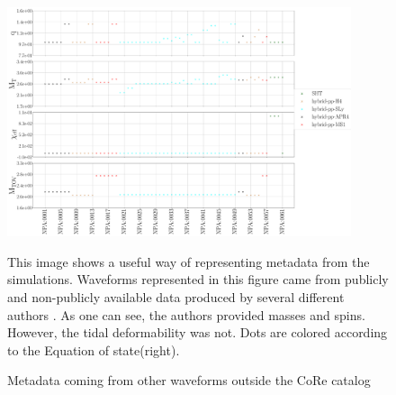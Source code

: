 \begin{figure}[hbt!]
\begin{center}
\includegraphics[width=0.9\textwidth, angle=0]{images/Data_analysis/results/LAL_cat.pdf} 
\caption{Metadata coming from other waveforms outside the CoRe catalog}
\end{center}
This image shows a useful way of representing metadata from the simulations. Waveforms represented in this figure came from publicly and non-publicly available data produced by several different authors \cite{Maione:2016zqz, Kastaun:2016elu, Maione:2017aux, Ciolfi:2017uak, Feo:2016cbs, Kawamura:2016nmk, DePietri:2015lya, DePietri:2018tpx}. As one can see, the authors provided masses and spins. However, the tidal deformability was not. Dots are colored according to the Equation of state(right).
\label{lalcat}
\end{figure}

\FloatBarrier


